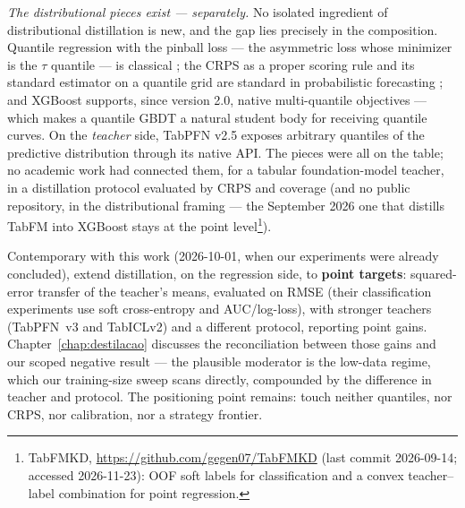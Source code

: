 \emph{The distributional pieces exist --- separately.} No isolated
ingredient of distributional distillation is new, and the gap lies
precisely in the composition. Quantile regression with the pinball
loss --- the asymmetric loss whose minimizer is the $\tau$ quantile
--- is classical \citep{koenker1978}; the CRPS as a proper scoring
rule and its standard estimator on a quantile grid are standard in
probabilistic forecasting \citep{gneiting2007,gneiting2011}; and
XGBoost \citep{chen2016} supports, since version 2.0, native
multi-quantile objectives --- which makes a quantile GBDT a natural
student body for receiving quantile curves. On the \emph{teacher}
side, TabPFN v2.5 exposes arbitrary quantiles of the predictive
distribution through its native API. The pieces were all on the
table; no academic work had connected them, for a tabular
foundation-model teacher, in a distillation protocol evaluated by
CRPS and coverage (and no public repository,
in the distributional framing --- the September 2026 one that
distills TabFM into XGBoost stays at the point
level\footnote{TabFMKD,
\url{https://github.com/gegen07/TabFMKD} (last commit 2026-09-14;
accessed 2026-11-23): OOF soft labels for classification and a
convex teacher--label combination for point regression.}).

Contemporary with this work (2026-10-01, when our experiments were
already concluded), \citet{jeong2026} extend distillation, on the
regression side, to \textbf{point targets}: squared-error transfer
of the teacher's means, evaluated on RMSE (their classification
experiments use soft cross-entropy and AUC/log-loss), with stronger
teachers (TabPFN~v3 and TabICLv2) and a different protocol,
reporting point gains. Chapter~\ref{chap:destilacao} discusses the
reconciliation between those gains and our scoped negative result
--- the plausible moderator is the low-data regime, which our
training-size sweep scans directly, compounded by the difference
in teacher and protocol. The positioning point remains:
\citet{jeong2026} touch neither quantiles, nor CRPS, nor
calibration, nor a strategy frontier.

